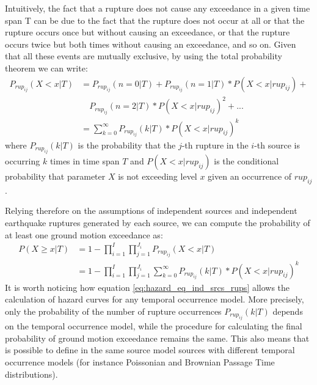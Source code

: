 Intuitively, the fact that a rupture does not cause any
exceedance in a given time span T can be due to the fact that the rupture does not occur at all or that the
rupture occurs once but without causing an exceedance, or that the rupture occurs twice but both times
without causing an exceedance, and so on. Given that all these events are mutually exclusive, by using the
total probability theorem we can write:
\begin{align}
\label{eq:prup_noexceed_rup}
P_{rup_{ij}}(X < x | T) & = P_{rup_{ij}}(n = 0 | T) + P_{rup_{ij}}(n = 1 | T) * P(X < x | rup_{ij}) + \nonumber \\
                                &\quad	P_{rup_{ij}}(n = 2 | T) * P(X < x | rup_{ij})^{2}  + ... \nonumber \\
				 & = \sum_{k=0}^{\infty} P_{rup_{ij}}(k | T) * P(X < x | rup_{ij}) ^ {k} 
\end{align}
where $P_{rup_{ij}}(k | T)$ is the probability that the $j$-th rupture in the $i$-th source is occurring $k$ times in time span $T$ and
$P(X < x | rup_{ij})$ is the conditional probability that parameter $X$ is not exceeding level $x$ given an
occurrence of $rup_{ij}$. 

Relying therefore on the assumptions of independent sources and independent earthquake ruptures generated by each source, we can compute
the probability of at least one ground motion exceedance as:
\begin{align}
\label{eq:hazard_eq_ind_srcs_rups}
P(X \ge x | T) & =  1 - \prod_{i=1}^{I} \prod_{j=1}^{J_{i}} P_{rup_{ij}}(X < x | T) \nonumber \\
                     & = 1 - \prod_{i=1}^{I} \prod_{j=1}^{J_{i}} \sum_{k=0}^{\infty} P_{rup_{ij}}(k | T) * P(X < x | rup_{ij}) ^ {k} 
\end{align}
It is worth noticing how equation \ref{eq:hazard_eq_ind_srcs_rups} allows the calculation of hazard curves for any
temporal occurrence model. More precisely, only the probability of the number of rupture occurrences $P_{rup_{ij}}(k | T)$
depends on the temporal occurrence model, while the procedure for calculating the final probability of ground motion exceedance
remains the same. This also means that is possible to define in the same source model sources with different temporal occurrence
models (for instance Poissonian and Brownian Passage Time distributions).


